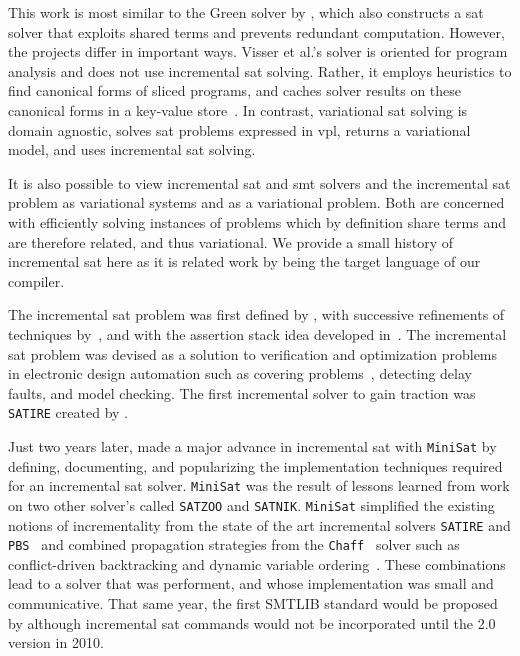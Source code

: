 \label{section:related-work:similar-solvers}
%
This work is most similar to the Green solver by \citet{VGD:FSE12}, which also
constructs a \ac{sat} solver that exploits shared terms and prevents redundant
computation. However, the projects differ in important ways. Visser et al.'s
solver is oriented for program analysis and does not use incremental \ac{sat}
solving. Rather, it employs heuristics to find canonical forms of sliced
programs, and caches solver results on these canonical forms in a key-value
store~\citep{redis}. In contrast, variational \ac{sat} solving is domain
agnostic, solves \ac{sat} problems expressed in \ac{vpl}, returns a variational
model, and uses incremental \ac{sat} solving.

It is also possible to view incremental \ac{sat} and \ac{smt} solvers and the
incremental \ac{sat} problem as variational systems and as a variational
problem. Both are concerned with efficiently solving instances of problems which
by definition share terms and are therefore related, and thus variational. We
provide a small history of incremental \ac{sat} here as it is related work by
being the target language of our compiler.

The incremental \ac{sat} problem was first defined by \citet{hooker_1993}, with
successive refinements of techniques by~\citet{branch-bound}, and with the
assertion stack idea developed in~\citet{kim2000solving}. The incremental
\ac{sat} problem was devised as a solution to verification and optimization
problems in electronic design automation such as covering
problems~\cite{10.1145/217474.217603}, detecting delay
faults\cite{10.1145/343647.343801}, and model
checking\cite{Clarke:1986:AVF:5397.5399}. The first incremental solver to gain
traction was \texttt{SATIRE} created by \citet{10.1145/378239.379019}.

Just two years later, \citet{10.1007/978-3-540-24605-3_37} made a major advance
in incremental \ac{sat} with \texttt{MiniSat} by defining, documenting, and
popularizing the implementation techniques required for an incremental \ac{sat}
solver. \texttt{MiniSat} was the result of lessons learned from work on two
other solver's called \texttt{SATZOO} and \texttt{SATNIK}. \texttt{MiniSat}
simplified the existing notions of incrementality from the state of the art
incremental solvers \texttt{SATIRE} and
\texttt{PBS}~\cite{10.1145/774572.774638} and combined propagation strategies
from the \texttt{Chaff}~\cite{Moskewicz:2001:CEE:378239.379017} solver such as
conflict-driven backtracking\cite{Zhang:2001:ECD:603095.603153} and dynamic
variable ordering~\cite{Moskewicz:2001:CEE:378239.379017}. These combinations
lead to a solver that was performent, and whose implementation was small and
communicative. That same year, the first SMTLIB standard would be proposed by
\citet{SMT-LIBformat} although incremental \ac{sat} commands would not be
incorporated until the 2.0 version\cite{BarST-RR-10} in 2010.

